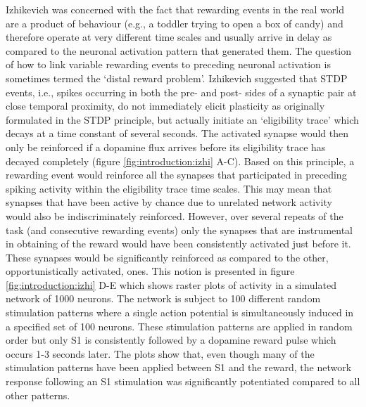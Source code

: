     Izhikevich was concerned with the fact that rewarding events in the real world are a product of behaviour (e.g., a toddler trying to open a box of candy) and  therefore operate at very different time scales and usually arrive in delay as compared to the neuronal activation pattern that generated them. The question of how to link variable rewarding events to preceding neuronal activation is sometimes termed the `distal reward problem'. Izhikevich suggested that STDP events, i.e., spikes occurring in both the pre- and post- sides of a synaptic pair at close temporal proximity, do not immediately elicit plasticity as originally formulated in the STDP principle, but actually initiate an `eligibility trace' which decays at a time constant of several seconds. The activated synapse would then only be reinforced if a dopamine flux arrives before its eligibility trace has decayed completely (figure \ref{fig:introduction:izhi} A-C). Based on this principle, a rewarding event would reinforce all the synapses that participated in preceding spiking activity within the eligibility trace time scales. This may mean that synapses that have been active by chance due to unrelated network activity would also be indiscriminately reinforced. However, over several repeats of the task (and consecutive rewarding events) only the synapses that are instrumental in obtaining of the reward would have been consistently activated just before it. These synapses would be significantly reinforced as compared to the other, opportunistically activated, ones. This notion is presented in figure \ref{fig:introduction:izhi} D-E which shows raster plots of activity in a simulated network of 1000 neurons. The network is subject to 100 different random stimulation patterns where a single action potential is simultaneously induced in a specified set of 100 neurons. These stimulation patterns are applied in random order but only S\textsc{1} is consistently followed by a dopamine reward pulse which occurs 1-3 seconds later. The plots show that, even though many of the stimulation patterns have been applied between S\textsc{1} and the reward, the network response following an S\textsc{1} stimulation was significantly potentiated compared to all other patterns.

